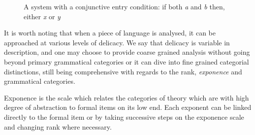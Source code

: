 \begin{figure}[H]
    \centering
    \caption{A system with a conjunctive entry condition: if both \textit{a} and \textit{b} then, either \textit{x} or \textit{y}}
    \label{fig:system-network-notation4}
\end{figure}


It is worth noting that when a piece of language is analysed, it can be approached at various levels of delicacy. We say that delicacy is variable in description, and one may choose to provide coarse grained analysis without going beyond primary grammatical categories or it can dive into fine grained categorial distinctions, still being comprehensive with regards to the rank, \textit{exponence} and grammatical categories. 

\begin{definition}[Exponence]\label{def:exponence-sydney}
    Exponence is the scale which relates the categories of theory which are with high degree of abstraction to formal items on its low end. Each exponent can be linked directly to the formal item or by taking successive steps on the exponence scale and changing rank where necessary. \citet[57]{Halliday2002}
\end{definition}

